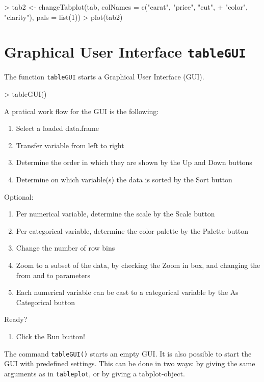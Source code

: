 \documentclass[11pt, fleqn, a4paper]{article}
\newenvironment{myindentpar}[1]%
{\begin{list}{}%
         {\setlength{\leftmargin}{#1}}%
         \item[]%
}
{\end{list}}
\begin{document}
\begin{Schunk}
\begin{Sinput}
> tab2 <- changeTabplot(tab, colNames = c("carat", "price", "cut", 
+     "color", "clarity"), pals = list(1))
> plot(tab2)
\end{Sinput}
\end{Schunk}



\section{Graphical User Interface {\tt tableGUI}}
The function {\tt tableGUI} starts a Graphical User Interface (GUI).
\begin{Schunk}
\begin{Sinput}
> tableGUI()
\end{Sinput}
\end{Schunk}
A pratical work flow for the GUI is the following:
\begin{myindentpar}{1cm}
{\footnotesize
\begin{enumerate}
\item Select a loaded data.frame
\item Transfer variable from left to right
\item Determine the order in which they are shown by the Up and Down buttons
\item Determine on which variable(s) the data is sorted by the Sort button
\end{enumerate}
Optional:
\begin{enumerate}[resume]
\item Per numerical variable, determine the scale by the Scale button
\item Per categorical variable, determine the color palette by the Palette button
\item Change the number of row bins 
\item Zoom to a subset of the data, by checking the Zoom in box, and changing the from and to parameters
\item Each numerical variable can be cast to a categorical variable by the As Categorical button
\end{enumerate}
Ready?
\begin{enumerate}[resume]
\item Click the Run button!
\end{enumerate}
}
\end{myindentpar}

The command {\tt tableGUI()} starts an empty GUI. It is also possible to start the GUI with predefined settings. This can be done in two ways: by giving the same arguments as in {\tt tableplot}, or by giving a tabplot-object.
\end{document}
